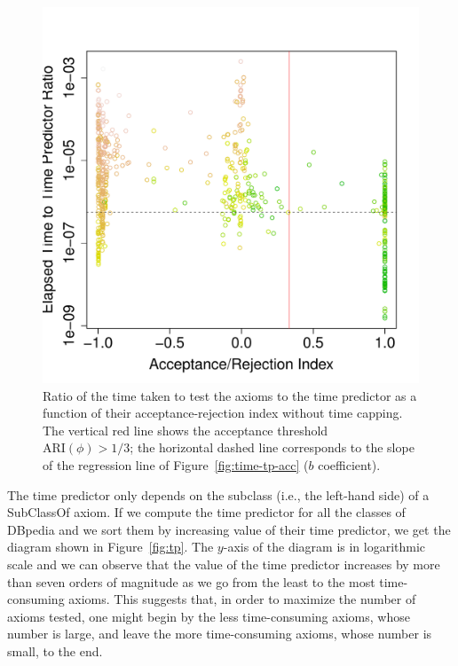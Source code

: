 \documentclass{sig-alternate}
\begin{document}
\begin{figure}[t]
\begin{center}
  \includegraphics[height=\plotheight]{ratio-ARI}
\end{center}
\caption{Ratio of the time taken to test the axioms to the time predictor
  as a function of their acceptance-rejection index without time capping.
  The vertical red line shows the acceptance threshold $\mathrm{ARI}(\phi)>1/3$;
  the horizontal dashed line corresponds to the slope of the regression line
  of Figure~\ref{fig:time-tp-acc} ($b$ coefficient).}
\label{fig:ratio-ARI}
\end{figure}

The time predictor only depends on the subclass (i.e., the left-hand side)
of a \textsf{SubClassOf} axiom. If we compute the
time predictor for all the classes of DBpedia and we sort them by increasing value
of their time predictor, we get the diagram shown in Figure~\ref{fig:tp}.
The $y$-axis of the diagram is in logarithmic scale and we can observe that
the value of the time predictor increases by more than seven orders of magnitude
as we go from the least to the most time-consuming axioms.
This suggests that, in order to maximize the number of axioms tested,
one might begin by the less time-consuming axioms, whose number is large,
and leave the more time-consuming axioms, whose number is small, to the end.
\end{document}
